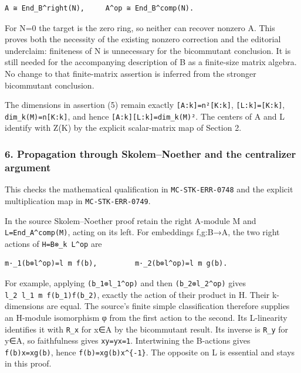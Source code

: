 \begin{verbatim}
A ≅ End_B^right(N),     A^op ≅ End_B^comp(N).
\end{verbatim}

For N=0 the target is the zero ring, so neither can recover nonzero A. This proves both the necessity of the existing nonzero correction and the editorial underclaim: finiteness of N is unnecessary for the bicommutant conclusion. It is still needed for the accompanying description of B as a finite-size matrix algebra. No change to that finite-matrix assertion is inferred from the stronger bicommutant conclusion.

The dimensions in assertion (5) remain exactly \texttt{{[}A:k{]}=n²{[}K:k{]}}, \texttt{{[}L:k{]}={[}K:k{]}}, \texttt{dim\_k(M)=n{[}K:k{]}}, and hence \texttt{{[}A:k{]}{[}L:k{]}=dim\_k(M)²}. The centers of A and L identify with Z(K) by the explicit scalar-matrix map of Section 2.

\subsubsection{6. Propagation through Skolem--Noether and the centralizer argument}\label{propagation-through-skolemnoether-and-the-centralizer-argument}

This checks the mathematical qualification in \texttt{MC-STK-ERR-0748} and the explicit multiplication map in \texttt{MC-STK-ERR-0749}.

In the source Skolem--Noether proof retain the right A-module M and \texttt{L=End\_A\^{}comp(M)}, acting on its left. For embeddings f,g:B→A, the two right actions of \texttt{H=B⊗\_k\ L\^{}op} are

\begin{verbatim}
m·_1(b⊗l^op)=l m f(b),         m·_2(b⊗l^op)=l m g(b).
\end{verbatim}

For example, applying \texttt{(b\_1⊗l\_1\^{}op)} and then \texttt{(b\_2⊗l\_2\^{}op)} gives \texttt{l\_2\ l\_1\ m\ f(b\_1)f(b\_2)}, exactly the action of their product in H. Their k-dimensions are equal. The source's finite simple classification therefore supplies an H-module isomorphism φ from the first action to the second. Its L-linearity identifies it with \texttt{R\_x} for x∈A by the bicommutant result. Its inverse is \texttt{R\_y} for y∈A, so faithfulness gives \texttt{xy=yx=1}. Intertwining the B-actions gives \texttt{f(b)x=xg(b)}, hence \texttt{f(b)=xg(b)x\^{}\{-1\}}. The opposite on L is essential and stays in this proof.

